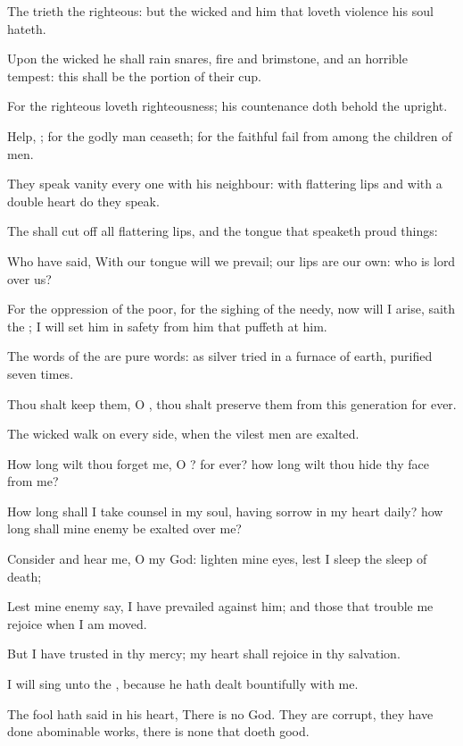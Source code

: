 \Verse The \LORD trieth the righteous: but the wicked and him that loveth violence his soul hateth.

\Verse Upon the wicked he shall rain snares, fire and brimstone, and an horrible tempest: this shall be the portion of their cup.

\Verse For the righteous \LORD loveth righteousness; his countenance doth behold the upright.




\Chapter
\Verse Help, \LORD; for the godly man ceaseth; for the faithful fail from among the children of men.

\Verse They speak vanity every one with his neighbour: with flattering lips and with a double heart do they speak.

\Verse The \LORD shall cut off all flattering lips, and the tongue that speaketh proud things:

\Verse Who have said, With our tongue will we prevail; our lips are our own: who is lord over us?

\Verse For the oppression of the poor, for the sighing of the needy, now will I arise, saith the \LORD; I will set him in safety from him that puffeth at him.

\Verse The words of the \LORD are pure words: as silver tried in a furnace of earth, purified seven times.

\Verse Thou shalt keep them, O \LORD, thou shalt preserve them from this generation for ever.

\Verse The wicked walk on every side, when the vilest men are exalted.




\Chapter
\Verse How long wilt thou forget me, O \LORD? for ever? how long wilt thou hide thy face from me?

\Verse How long shall I take counsel in my soul, having sorrow in my heart daily? how long shall mine enemy be exalted over me?

\Verse Consider and hear me, O \LORD my God: lighten mine eyes, lest I sleep the sleep of death;

\Verse Lest mine enemy say, I have prevailed against him; and those that trouble me rejoice when I am moved.

\Verse But I have trusted in thy mercy; my heart shall rejoice in thy salvation.

\Verse I will sing unto the \LORD, because he hath dealt bountifully with me.




\Chapter
\Verse The fool hath said in his heart, There is no God. They are corrupt, they have done abominable works, there is none that doeth good.

